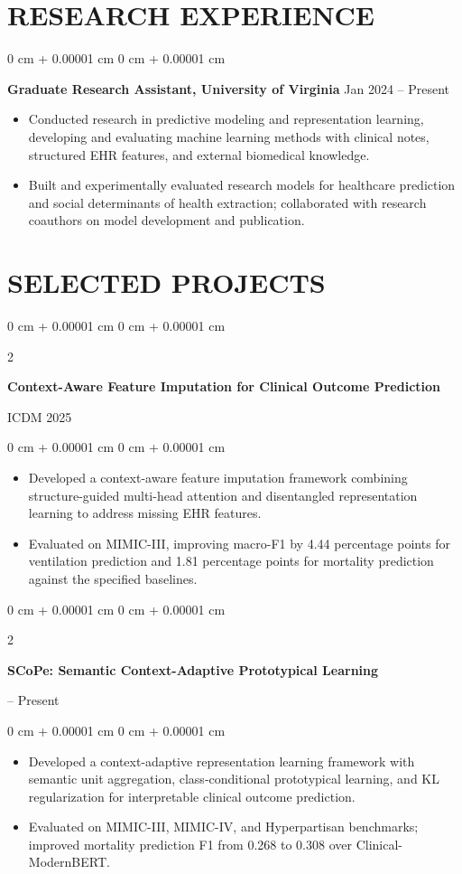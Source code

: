 \documentclass[10pt, letterpaper]{article}
\newenvironment{highlights}{
    \begin{itemize}[
        topsep=0.03 cm,
        parsep=0.03 cm,
        partopsep=0pt,
        itemsep=0pt,
        leftmargin=0 cm + 10pt
    ]
}{
    \end{itemize}
} %
\newenvironment{onecolentry}{
    \begin{adjustwidth}{
        0 cm + 0.00001 cm
    }{
        0 cm + 0.00001 cm
    }
}{
    \end{adjustwidth}
} %
\newenvironment{twocolentry}[2][]{
    \onecolentry
    \def\secondColumn{#2}
    \setcolumnwidth{\fill, 4.5 cm}
    \begin{paracol}{2}
}{
    \switchcolumn \raggedleft \secondColumn
    \end{paracol}
    \endonecolentry
} %
\begin{document}
\section{RESEARCH EXPERIENCE}
\begin{onecolentry}
\textbf{Graduate Research Assistant, University of Virginia} \hfill Jan 2024 -- Present
\begin{highlights}
\item Conducted research in predictive modeling and representation learning, developing and evaluating machine learning methods with clinical notes, structured EHR features, and external biomedical knowledge.
\item Built and experimentally evaluated research models for healthcare prediction and social determinants of health extraction; collaborated with research coauthors on model development and publication.
\end{highlights}
\end{onecolentry}
\section{SELECTED PROJECTS}

\begin{twocolentry}{ICDM 2025}
\textbf{Context-Aware Feature Imputation for Clinical Outcome Prediction}
\end{twocolentry}
\begin{onecolentry}
\begin{highlights}
\item Developed a context-aware feature imputation framework combining structure-guided multi-head attention and disentangled representation learning to address missing EHR features.
\item Evaluated on MIMIC-III, improving macro-F1 by 4.44 percentage points for ventilation prediction and 1.81 percentage points for mortality prediction against the specified baselines.
\end{highlights}
\end{onecolentry}
\vspace{0.06 cm}

\begin{twocolentry}{2026 -- Present}
\textbf{SCoPe: Semantic Context-Adaptive Prototypical Learning}
\end{twocolentry}
\begin{onecolentry}
\begin{highlights}
\item Developed a context-adaptive representation learning framework with semantic unit aggregation, class-conditional prototypical learning, and KL regularization for interpretable clinical outcome prediction.
\item Evaluated on MIMIC-III, MIMIC-IV, and Hyperpartisan benchmarks; improved mortality prediction F1 from 0.268 to 0.308 over Clinical-ModernBERT.
\end{highlights}
\end{onecolentry}
\vspace{0.06 cm}
\end{document}
